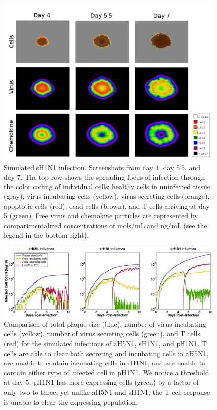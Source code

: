 \documentclass[10pt]{article}
\begin{document}
\begin{figure}[ht!]
\begin{center}
 \includegraphics[width=\textwidth]{cycells}
 \end{center}
\caption{Simulated sH1N1 infection. Screenshots from day 4, day 5.5, and day 7.  The top row shows the spreading focus of infection  through the color coding of individual cells:  healthy cells in uninfected tissue (gray),  virus-incubating cells (yellow), virus-secreting cells (orange), apoptotic cells (red), dead cells (brown), and T cells arriving at day 5 (green).  Free virus and chemokine particles are represented by compartmentalized concentrations of mols/mL and ng/mL (see the legend in the bottom right).} 
 \label{fig:cycells}
\end{figure}


\begin{figure}[ht!]
\begin{center}
 \includegraphics[width=\textwidth]{plaquesize}
 \end{center}
\caption{Comparison of total plaque size (blue), number of virus incubating cells (yellow), number of virus secreting cells (green), and T cells (red) for the simulated infections of aH5N1, sH1N1, and pH1N1.  T cells are able to clear both secreting and incubating cells in aH5N1, are unable to contain incubating cells in sH1N1, and are unable to contain either type of infected cell in pH1N1.  We notice a threshold at day 5: pH1N1 has more expressing cells (green) by a factor of only two to three, yet unlike aH5N1 and sH1N1, the T cell response is unable to clear the expressing population.} 
 \label{fig:plaquesize}
\end{figure}
\end{document}
